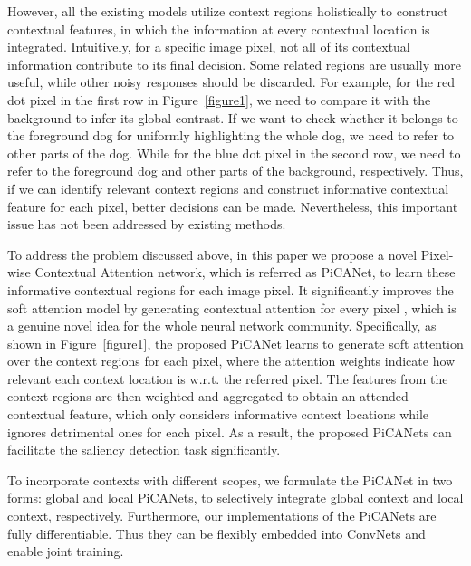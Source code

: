 \documentclass[10pt,twocolumn,letterpaper]{article}
\begin{document}
However, all the existing models utilize context regions holistically to construct contextual features, in which the information at every contextual location is integrated.
%
Intuitively, for a specific image pixel, not all of its contextual information contribute to its final decision.
%
Some related regions are usually more useful, while other noisy responses should be discarded.
%
For example, for the red dot pixel in the first row in Figure~\ref{figure1},
we need to compare it with the background to infer its global contrast.
%
If we want to check whether it belongs to the foreground dog for uniformly highlighting the whole dog, we need to refer to other parts of the dog.
%
While for the blue dot pixel in the second row, we need to refer to the foreground dog and other parts of the background, respectively.
%
Thus, if we can identify relevant context regions and construct informative contextual feature for each pixel, better decisions can be made.
%
Nevertheless, this important issue has not been addressed by existing methods.

To address the problem discussed above, in this paper we propose a novel Pixel-wise Contextual Attention network, which is referred as PiCANet, to learn these informative contextual regions for each image pixel.
%
It significantly improves the soft attention model \cite{bahdanau2015attention} by generating contextual attention for every pixel
, which is a genuine novel idea for the whole neural network community. 
%
Specifically, as shown in Figure~\ref{figure1}, the proposed PiCANet learns to generate soft attention over the context regions for each pixel, where the attention weights indicate how relevant each context location is w.r.t. the referred pixel.
%
The features from the context regions are then weighted and aggregated to obtain an attended contextual feature, which only considers informative context locations while ignores detrimental ones for each pixel.
%
As a result, the proposed PiCANets can facilitate the saliency detection task significantly.

To incorporate contexts with different scopes, we formulate the PiCANet in two forms: global and local PiCANets, to selectively integrate global context and local context, respectively.
%
Furthermore, our implementations of the PiCANets are fully differentiable. Thus they can be flexibly embedded into ConvNets and enable joint training.
\end{document}
